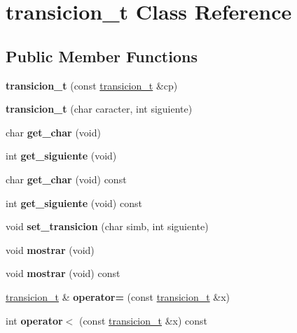 \hypertarget{classtransicion__t}{}\section{transicion\+\_\+t Class Reference}
\label{classtransicion__t}
\subsection*{Public Member Functions}
\begin{DoxyCompactItemize}
\item 
\hypertarget{classtransicion__t_ad189c5587e9592a91267fa30029bb67e}{}\label{classtransicion__t_ad189c5587e9592a91267fa30029bb67e} 
{\bfseries transicion\+\_\+t} (const \hyperlink{classtransicion__t}{transicion\+\_\+t} \&cp)
\item 
\hypertarget{classtransicion__t_a08b2031d3acb6ad17957631e94a3db17}{}\label{classtransicion__t_a08b2031d3acb6ad17957631e94a3db17} 
{\bfseries transicion\+\_\+t} (char caracter, int siguiente)
\item 
\hypertarget{classtransicion__t_a16d60e18df31eaad272fde4c02472e6a}{}\label{classtransicion__t_a16d60e18df31eaad272fde4c02472e6a} 
char {\bfseries get\+\_\+char} (void)
\item 
\hypertarget{classtransicion__t_afda218eac35a096776b10eeb3418d9f5}{}\label{classtransicion__t_afda218eac35a096776b10eeb3418d9f5} 
int {\bfseries get\+\_\+siguiente} (void)
\item 
\hypertarget{classtransicion__t_a4092b18b8b2533a44120b369e60f0d6d}{}\label{classtransicion__t_a4092b18b8b2533a44120b369e60f0d6d} 
char {\bfseries get\+\_\+char} (void) const
\item 
\hypertarget{classtransicion__t_a8dc9ec15fa19e2f574efb09199aca854}{}\label{classtransicion__t_a8dc9ec15fa19e2f574efb09199aca854} 
int {\bfseries get\+\_\+siguiente} (void) const
\item 
\hypertarget{classtransicion__t_ab064f7e3c5aefaba742e424d9cf0568a}{}\label{classtransicion__t_ab064f7e3c5aefaba742e424d9cf0568a} 
void {\bfseries set\+\_\+transicion} (char simb, int siguiente)
\item 
\hypertarget{classtransicion__t_a04fdc0e8b5fcb241d7472d4abe384a9a}{}\label{classtransicion__t_a04fdc0e8b5fcb241d7472d4abe384a9a} 
void {\bfseries mostrar} (void)
\item 
\hypertarget{classtransicion__t_ae3d433160eafaed2a7d3cc5e0c207d9b}{}\label{classtransicion__t_ae3d433160eafaed2a7d3cc5e0c207d9b} 
void {\bfseries mostrar} (void) const
\item 
\hypertarget{classtransicion__t_a85a27b479e9e72888fab4c37968c7f8f}{}\label{classtransicion__t_a85a27b479e9e72888fab4c37968c7f8f} 
\hyperlink{classtransicion__t}{transicion\+\_\+t} \& {\bfseries operator=} (const \hyperlink{classtransicion__t}{transicion\+\_\+t} \&x)
\item 
\hypertarget{classtransicion__t_a9bd95ab04ea5a07c6be768bf7b5e39f9}{}\label{classtransicion__t_a9bd95ab04ea5a07c6be768bf7b5e39f9} 
int {\bfseries operator$<$} (const \hyperlink{classtransicion__t}{transicion\+\_\+t} \&x) const
\end{DoxyCompactItemize}
